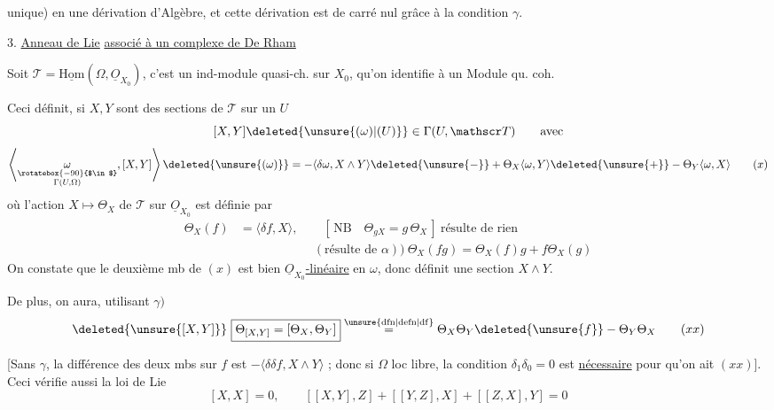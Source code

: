 unique) en une dérivation d'Algèbre, et cette dérivation est de carré nul grâce à la condition $\gamma$.


3.\quad {} \uline{Anneau de Lie} \uline{associé à un complexe de De Rham}

Soit $\mathscr T=\underline{\mathrm{Hom}}(\Omega,\underline O_{X_0})$, c'est un ind-module quasi-ch. sur $X_0$, qu'on identifie à un Module qu. coh.

Ceci définit, si $X,Y$ sont des sections de $\mathscr T$  sur un $U$
\[
[X,Y]\deleted{\unsure{(\omega)|(U)}}\in\Gamma(U,\mathscr T)\qquad\text{avec}
\]
\[
\left\langle\underset{\substack{\rotatebox{-90}{$\in$}\\\Gamma(U,\Omega)}}{\omega},[X,Y]\right\rangle\deleted{\unsure{(\omega)}}=-\langle\delta\omega,X\wedge Y\rangle\deleted{\unsure{-}}+\Theta_X\langle\omega,Y\rangle\deleted{\unsure{+}}-\Theta_Y\langle\omega,X\rangle
\tag*{$(x)$}
\]
où l'action $X\mapsto\Theta_X$ de $\mathscr T$ sur $\underline O_{X_0}$  est définie par
\[
\begin{aligned}
\Theta_X(f)&=\langle\delta f,X\rangle,\qquad [\,\text{NB}\quad\boxed{\Theta_{gX}=g\,\Theta_X}\,]\ \text{résulte de rien}\\
&\hspace{6em}(\text{résulte de }\alpha))\ \boxed{\Theta_X(fg)=\Theta_X(f)g+f\Theta_X(g)}
\end{aligned}
\]
On constate  que le deuxième mb de $(x)$ est bien \uline{$\underline O_{X_0}$-linéaire} en $\omega$, donc définit une section $X\wedge Y$.

De plus, on aura, utilisant $\gamma)$
\[
\deleted{\unsure{[X,Y]}}\ \boxed{\Theta_{[X,Y]}=[\Theta_X,\Theta_Y]}\overset{\mathrm{\unsure{dfn|defn|df}}}{=}\Theta_X\Theta_Y\deleted{\unsure{f}}-\Theta_Y\Theta_X
\tag*{$(xx)$}
\]
\deleted{[\unsure{Si on|Sinon} \unsure{veut|vient} l'autre définition}

[Sans $\gamma$, la  différence des deux mbs sur $f$ est $-\langle\delta\delta f,X\wedge Y\rangle$ ; donc si $\Omega$ loc libre, la condition $\delta_1\delta_0=0$ est \uline{nécessaire} pour qu'on ait $(xx)$]. Ceci vérifie aussi la loi de Lie
\[
\boxed{[X,X]=0},\qquad\boxed{[[X,Y],Z]+[[Y,Z],X]+[[Z,X],Y]=0}
\]


